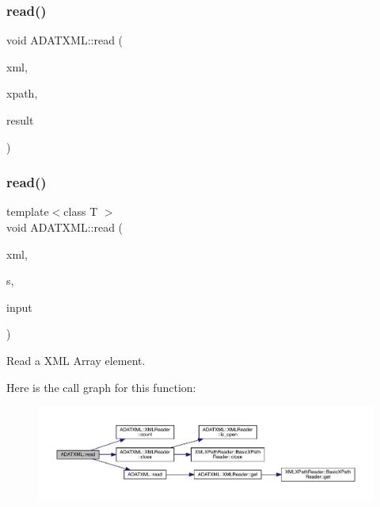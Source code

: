 \mbox{\label{group__io_ga49fa13abbc0b2a2273c58d328d1e7d70}} 
\subsubsection{\texorpdfstring{read()}{read()}\hspace{0.1cm}{\footnotesize\ttfamily [31/52]}}
{\footnotesize\ttfamily void A\+D\+A\+T\+X\+M\+L\+::read (\begin{DoxyParamCaption}\item[{\mbox{\hyperlink{classADATXML_1_1XMLReader}{X\+M\+L\+Reader}} \&}]{xml,  }\item[{const std\+::string \&}]{xpath,  }\item[{std\+::vector$<$ double $>$ \&}]{result }\end{DoxyParamCaption})}

\mbox{\label{group__io_gae58a41d3a914bc8eba546ada945fa97f}} 
\subsubsection{\texorpdfstring{read()}{read()}\hspace{0.1cm}{\footnotesize\ttfamily [32/52]}}
{\footnotesize\ttfamily template$<$class T $>$ \\
void A\+D\+A\+T\+X\+M\+L\+::read (\begin{DoxyParamCaption}\item[{\mbox{\hyperlink{classADATXML_1_1XMLReader}{X\+M\+L\+Reader}} \&}]{xml,  }\item[{const std\+::string \&}]{s,  }\item[{std\+::vector$<$ T $>$ \&}]{input }\end{DoxyParamCaption})\hspace{0.3cm}{\ttfamily [inline]}}



Read a X\+ML Array element. 

Here is the call graph for this function\+:\nopagebreak
\begin{figure}[H]
\begin{center}
\leavevmode
\includegraphics[width=350pt]{d2/da3/group__io_gae58a41d3a914bc8eba546ada945fa97f_cgraph}
\end{center}
\end{figure}
\mbox{\label{group__io_gab7d805fe66e6e3f1f897d4dabd3b29ad}} 
